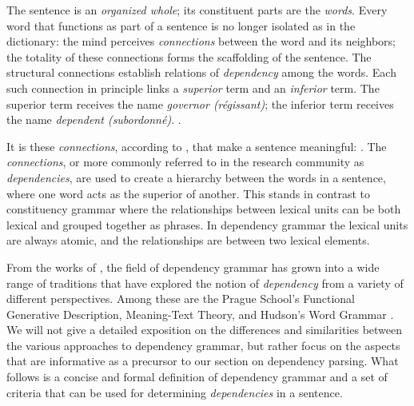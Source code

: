 \begin{displayquote}
The sentence is an \textit{organized whole}; its constituent parts are the \textit{words}. Every word that functions as part of a sentence is no longer isolated as in the dictionary: the mind perceives \textit{connections} between the word and its neighbors; the totality of these connections forms the scaffolding of the sentence. The structural connections establish relations of \textit{dependency} among the words. Each such connection in principle links a \textit{superior} term and an \textit{inferior} term. The superior term receives the name \textit{governor (r\'{e}gissant)}; the inferior term receives the name \textit{dependent (subordonn\'{e})}. \cite{Tes:15}.
\end{displayquote}

It is these \textit{connections}, according to \citeauthor{Tes:15}, that make a sentence meaningful:  \cite{Tes:15}. The \textit{connections}, or more commonly referred to in the research community as \textit{dependencies}, are used to create a hierarchy between the words in a sentence, where one word acts as the superior of another. This stands in contrast to constituency grammar where the relationships between lexical units can be both lexical and grouped together as phrases. In dependency grammar the lexical units are always atomic, and the relationships are between two lexical elements. 

From the works of \citeauthor{Tes:15}, the field of dependency grammar has grown into a wide range of traditions that have explored the notion of \textit{dependency} from a variety of different perspectives. Among these are the Prague School's Functional Generative Description, Meaning-Text Theory, and Hudson's Word Grammar \cite{Sgall:86, Mel:88, Hudson:90}. We will not give a detailed exposition on the differences and similarities between the various approaches to dependency grammar, but rather focus on the aspects that are informative as a precursor to our section on dependency parsing. What follows is a concise and formal definition of dependency grammar and a set of criteria that can be used for determining \textit{dependencies} in a sentence.

